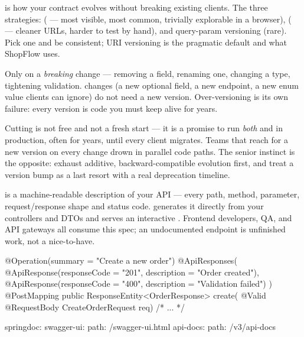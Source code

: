 
  is how your contract evolves without breaking existing clients. The three strategies:  ( --- most visible, most common, trivially explorable in a browser),  ( --- cleaner URLs, harder to test by hand), and query-param versioning (rare). Pick one and be consistent; URI versioning is the pragmatic default and what ShopFlow uses.

 Only on a \emph{breaking} change --- removing a field, renaming one, changing a type, tightening validation.  changes (a new optional field, a new endpoint, a new enum value clients can ignore) do not need a new version. Over-versioning is its own failure: every version is code you must keep alive for years.

\begin{misconception}
Cutting  is not free and not a fresh start --- it is a promise to run \emph{both}  and  in production, often for years, until every client migrates. Teams that reach for a new version on every change drown in parallel code paths. The senior instinct is the opposite: exhaust additive, backward-compatible evolution first, and treat a version bump as a last resort with a real deprecation timeline.
\end{misconception}

  is a machine-readable description of your API --- every path, method, parameter, request/response shape and status code.  generates it directly from your controllers and DTOs and serves an interactive . Frontend developers, QA, and API gateways all consume this spec; an undocumented endpoint is unfinished work, not a nice-to-have.

\begin{javabox}
@Operation(summary = "Create a new order")
@ApiResponses({
  @ApiResponse(responseCode = "201", description = "Order created"),
  @ApiResponse(responseCode = "400", description = "Validation failed")
})
@PostMapping
public ResponseEntity<OrderResponse> create(
    @Valid @RequestBody CreateOrderRequest req) { /* ... */ }
\end{javabox}

\begin{yamlbox}
springdoc:
  swagger-ui:
    path: /swagger-ui.html
  api-docs:
    path: /v3/api-docs
\end{yamlbox}

